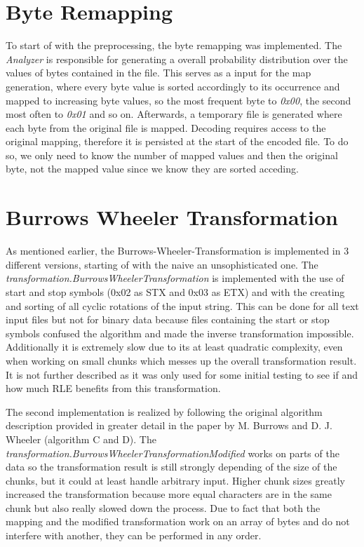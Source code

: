 \section{Byte Remapping}
\label{ch:Implementation:bytemapping}
\par{
	To start of with the preprocessing, the byte remapping was implemented. The \emph{Analyzer} is responsible for generating a overall probability distribution over the values of bytes contained in the file. This serves as a input for the map generation, where every byte value is sorted accordingly to its occurrence and mapped to increasing byte values, so the most frequent byte to \textit{0x00}, the second most often to \textit{0x01} and so on. Afterwards, a temporary file is generated where each byte from the original file is mapped. Decoding requires access to the original mapping, therefore it is persisted at the start of the encoded file. To do so, we only need to know the number of mapped values and then the original byte, not the mapped value since we know they are sorted acceding.
}
\section{Burrows Wheeler Transformation}
\label{ch:Implementation:bwt}
\par{
	As mentioned earlier, the Burrows-Wheeler-Transformation is implemented in 3 different versions, starting of with the naive an unsophisticated one. The \emph{transformation.BurrowsWheelerTransformation} is implemented with the use of start and stop symbols (0x02 as STX and 0x03 as ETX) and with the creating and sorting of all cyclic rotations of the input string. This can be done for all text input files but not for binary data because files containing the start or stop symbols confused the algorithm and made the inverse transformation impossible. Additionally it is extremely slow due to its at least quadratic complexity, even when working on small chunks which messes up the overall transformation result. It is not further described as it was only used for some initial testing to see if and how much RLE benefits from this transformation. 
}
\par{
	The second implementation is realized by following the original algorithm description provided in greater detail in the paper by M. Burrows and D. J. Wheeler \cite{Burrows94} (algorithm C and D). The \emph{transformation.BurrowsWheelerTransformationModified} works on parts of the data so the transformation result is still strongly depending of the size of the chunks, but it could at least handle arbitrary input. Higher chunk sizes greatly increased the transformation because more equal characters are in the same chunk but also really slowed down the process. Due to fact that both the mapping and the modified transformation work on an array of bytes and do not interfere with another, they can be performed in any order.
}

